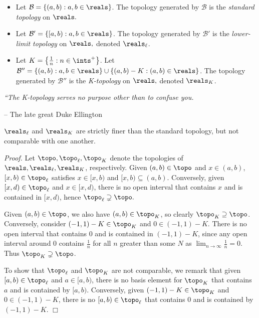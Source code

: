 \begin{itemize}
    \item Let $\mathcal{B} = \{(a, b) : a, b \in \reals\}$. The topology generated by $\mathcal{B}$ is the {\it standard topology} on $\reals.$
    \item Let $\mathcal{B}' = \{[a, b) : a, b \in \reals\}$. The topology generated by $\mathcal{B}'$ is the {\it lower-limit topology} on $\reals,$ denoted $\reals_\ell$.
    \item Let $K = \left\{\frac{1}{n}: n \in \ints^+\right\}$. Let $\mathcal{B}'' = \{(a, b) : a, b \in \reals\} \cup \{(a, b) - K: (a, b) \in \reals\}$. The topology generated by $\mathcal{B}''$ is the {\it K-topology} on $\reals,$ denoted $\reals_K$.
\end{itemize}
\vspace{10pt}

\begin{center}
    {\it ``The K-topology serves no purpose other than to confuse you.}

    -- The late great Duke Ellington
\end{center}
\vspace{10pt}

\begin{lemma}\label{2.6}
    $\reals_\ell$ and $\reals_K$ are strictly finer than the standard topology, but not comparable with one another.
\end{lemma}
{\it Proof.} Let $\topo, \topo_\ell, \topo_K$ denote the topologies of $\reals, \reals_\ell, \reals_K$, respectively. Given $(a, b) \in \topo$ and $x \in (a, b)$, $[x, b) \in \topo_\ell$ satisfies $x \in [x, b)$ and $[x, b) \subseteq (a, b)$. Conversely, given $[x, d) \in \topo_\ell$ and $x \in [x, d)$, there is no open interval that contains $x$ and is contained in $[x, d)$, hence $\topo_\ell \supsetneq \topo.$

Given $(a, b) \in \topo$, we also have $(a, b) \in \topo_K$, so clearly $\topo_K \supseteq \topo$. Conversely, consider $(-1, 1) - K \in \topo_K$ and $0 \in (-1, 1)- K$. There is no open interval that contains $0$ and is contained in $(-1, 1) - K$, since any open interval around $0$ contains $\frac1n$ for all $n$ greater than some $N$ as $\lim_{n \rightarrow \infty} \frac1n = 0$. Thus $\topo_K \supsetneq \topo$.

To show that $\topo_\ell$ and $\topo_K$ are not comparable, we remark that given $[a, b) \in \topo_\ell$ and $a \in [a, b)$, there is no basis element for $\topo_K$ that contains $a$ and is contained by $[a, b)$. Conversely, given $(-1, 1) - K \in \topo_K$ and $0 \in (-1, 1) - K$, there is no $[a, b) \in \topo_\ell$ that contains $0$ and is contained by $(-1, 1) - K$. $\Box$

